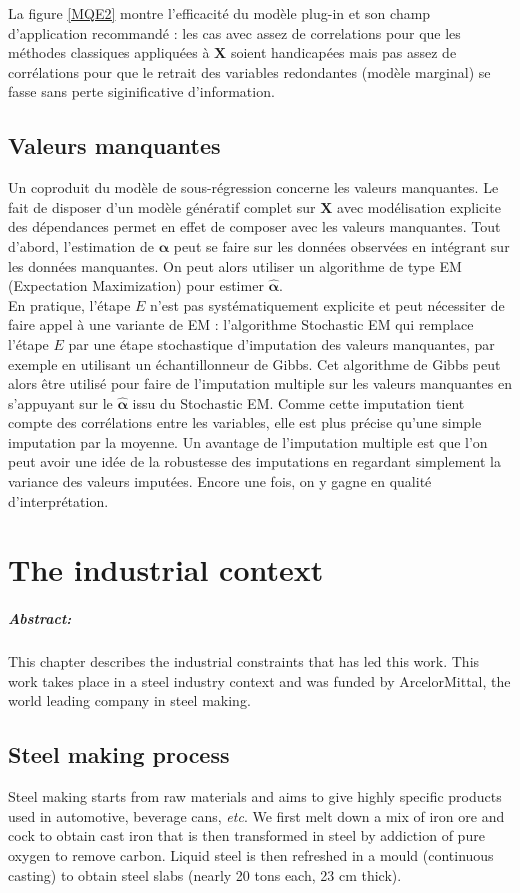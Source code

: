 \documentclass[12pt,a4paper]{report}
\begin{document}
	La figure \ref{MQE2} montre l'efficacité du modèle plug-in et son champ d'application recommandé : les cas avec assez de correlations pour que les méthodes classiques appliquées à $\boldsymbol{X}$ soient handicapées mais pas assez de corrélations pour que le retrait des variables redondantes (modèle marginal)  se fasse sans perte siginificative d'information.
		
	\section{Valeurs manquantes}
		Un coproduit du modèle de sous-régression concerne les valeurs manquantes. Le fait de disposer d'un modèle génératif complet sur $\boldsymbol{X}$ avec modélisation explicite des dépendances permet en effet de composer avec les valeurs manquantes. Tout d'abord, l'estimation de $\boldsymbol{\alpha}$ peut se faire sur les données observées en intégrant sur les données manquantes. On peut alors utiliser un algorithme de type EM (Expectation Maximization) pour estimer $\hat{\boldsymbol{\alpha}}$.\\
		 
		 En pratique, l'étape $E$ n'est pas systématiquement explicite et peut nécessiter de faire appel à une variante de EM : l'algorithme Stochastic EM qui remplace l'étape $E$ par une étape stochastique d'imputation des valeurs manquantes, par exemple en utilisant un échantillonneur de Gibbs. Cet algorithme de Gibbs peut alors être utilisé pour faire de l'imputation multiple sur les valeurs manquantes en s'appuyant sur le $\hat{\boldsymbol{\alpha}}$ issu du Stochastic EM. Comme cette imputation tient compte des corrélations entre les variables, elle est plus précise qu'une simple imputation par la moyenne. Un avantage de l'imputation multiple est que l'on peut avoir une idée de la robustesse des imputations en regardant simplement la variance des valeurs imputées. Encore une fois, on y gagne en qualité d'interprétation.  
\chapter{The industrial context}
	\paragraph{Abstract:} This chapter describes the industrial constraints that has led this work. This work takes place in a steel industry context and was funded by ArcelorMittal, the world leading company in steel making. 
\section{Steel making process}
	Steel making starts from raw materials and aims to give highly specific products used in automotive, beverage cans, {\it etc}.
	We first melt down a mix of iron ore and cock to obtain cast iron that is then transformed in steel by addiction of pure oxygen to remove carbon. Liquid steel is then refreshed in a mould (continuous casting) to obtain steel slabs (nearly 20 tons each, 23 cm thick). \\
	
\end{document}
